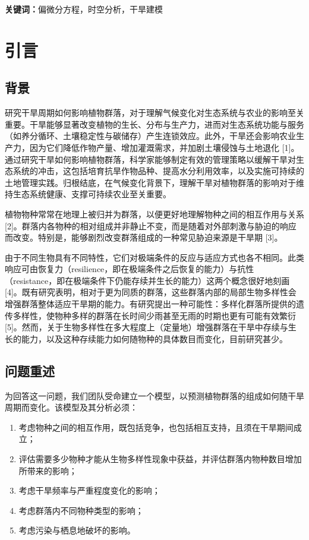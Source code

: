 \documentclass[11pt,a4paper]{ctexart}
\begin{document}
\vspace{6pt}
\noindent\textbf{关键词：}偏微分方程，时空分析，干旱建模

\newpage
\pagestyle{fancy}

\section{引言}

\subsection{背景}

研究干旱周期如何影响植物群落，对于理解气候变化对生态系统与农业的影响至关重要。干旱能够显著改变植物的生长、分布与生产力，进而对生态系统功能与服务（如养分循环、土壤稳定性与碳储存）产生连锁效应。此外，干旱还会影响农业生产力，因为它们降低作物产量、增加灌溉需求，并加剧土壤侵蚀与土地退化 [1]。通过研究干旱如何影响植物群落，科学家能够制定有效的管理策略以缓解干旱对生态系统的冲击，这包括培育抗旱作物品种、提高水分利用效率，以及实施可持续的土地管理实践。归根结底，在气候变化背景下，理解干旱对植物群落的影响对于维持生态系统健康、支撑可持续农业至关重要。

植物物种常常在地理上被归并为群落，以便更好地理解物种之间的相互作用与关系 [2]。群落内各物种的相对组成并非静止不变，而是随着对外部刺激与胁迫的响应而改变。特别是，能够剧烈改变群落组成的一种常见胁迫来源是干旱期 [3]。

由于不同生物具有不同特性，它们对极端条件的反应与适应方式也各不相同。此类响应可由恢复力（resilience，即在极端条件之后恢复的能力）与抗性（resistance，即在极端条件下仍能存续并生长的能力）这两个概念很好地刻画 [4]。既有研究表明，相对于更为同质的群落，这些群落内部的局部生物多样性会增强群落整体适应干旱期的能力。有研究提出一种可能性：多样化群落所提供的遗传多样性，使物种多样的群落在长时间少雨甚至无雨的时期也更有可能有效繁衍 [5]。然而，关于生物多样性在多大程度上（定量地）增强群落在干旱中存续与生长的能力，以及这种存续能力如何随物种的具体数目而变化，目前研究甚少。

\subsection{问题重述}

为回答这一问题，我们团队受命建立一个模型，以预测植物群落的组成如何随干旱周期而变化。该模型及其分析必须：

\begin{enumerate}
\item 考虑物种之间的相互作用，既包括竞争，也包括相互支持，且须在干旱期间成立；
\item 评估需要多少物种才能从生物多样性现象中获益，并评估群落内物种数目增加所带来的影响；
\item 考虑干旱频率与严重程度变化的影响；
\item 考虑群落内不同物种类型的影响；
\item 考虑污染与栖息地破坏的影响。
\end{enumerate}
\end{document}
